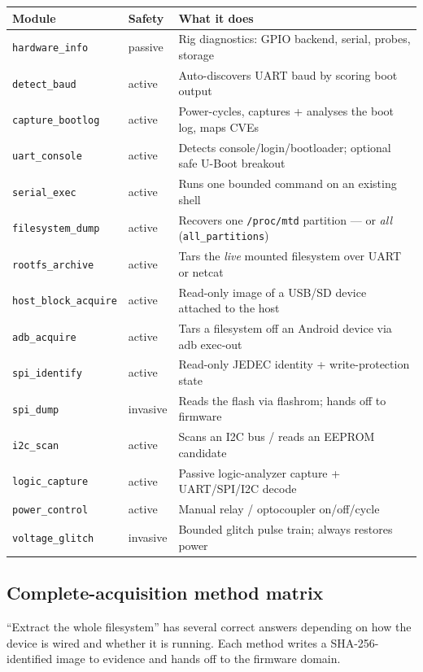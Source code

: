 \documentclass[11pt]{article}
\newif\ifintable\intablefalse
\newcommand{\code}[1]{\ifintable\texttt{#1}\else{\small\colorbox{codebg}{\texttt{#1}}}\fi}
\begin{document}
\begin{table}[h]
\centering\footnotesize\intabletrue
\begin{tabularx}{\textwidth}{@{}L{3.4cm} L{1.6cm} X@{}}
\toprule
\textbf{Module} & \textbf{Safety} & \textbf{What it does}\\
\midrule
\code{hardware\_info} & passive & Rig diagnostics: GPIO backend, serial, probes, storage\\
\code{detect\_baud} & active & Auto-discovers UART baud by scoring boot output\\
\code{capture\_bootlog} & active & Power-cycles, captures + analyses the boot log, maps CVEs\\
\code{uart\_console} & active & Detects console/login/bootloader; optional safe U-Boot breakout\\
\code{serial\_exec} & active & Runs one bounded command on an existing shell\\
\code{filesystem\_dump} & active & Recovers one \texttt{/proc/mtd} partition --- or \emph{all} (\texttt{all\_partitions})\\
\code{rootfs\_archive} & active & Tars the \emph{live} mounted filesystem over UART or netcat\\
\code{host\_block\_acquire} & active & Read-only image of a USB/SD device attached to the host\\
\code{adb\_acquire} & active & Tars a filesystem off an Android device via adb exec-out\\
\code{spi\_identify} & active & Read-only JEDEC identity + write-protection state\\
\code{spi\_dump} & invasive & Reads the flash via flashrom; hands off to firmware\\
\code{i2c\_scan} & active & Scans an I2C bus / reads an EEPROM candidate\\
\code{logic\_capture} & active & Passive logic-analyzer capture + UART/SPI/I2C decode\\
\code{power\_control} & active & Manual relay / optocoupler on/off/cycle\\
\code{voltage\_glitch} & invasive & Bounded glitch pulse train; always restores power\\
\bottomrule
\end{tabularx}
\end{table}

\subsection{Complete-acquisition method matrix}
``Extract the whole filesystem'' has several correct answers depending on how the
device is wired and whether it is running. Each method writes a SHA-256-identified
image to evidence and hands off to the firmware domain.
\end{document}
